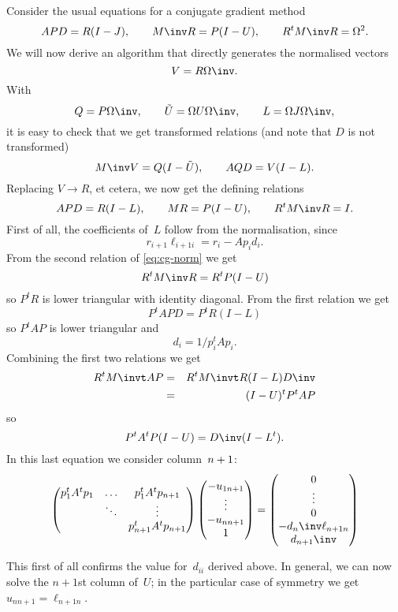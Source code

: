 \documentclass[11pt]{artikel3}
\begin{document}
\begin{Outline}
Consider the usual equations for a conjugate gradient method
\[ APD=R(I-J),\qquad M\inv R=P(I-U),\qquad R^tM\inv R=\Omega^2. \]
We will now derive an algorithm that directly generates
the normalised vectors
\[ V=R\Omega\inv.\]
With
\[ Q=P\Omega\inv,\qquad \tilde U=\Omega U\Omega\inv,
    \qquad L=\Omega J\Omega\inv,\]
it is easy to check that we get transformed relations
(and note that $D$ is not transformed)
\[ M\inv V=Q(I-\tilde U),\qquad AQD=V(I-L). \]
Replacing $V\rightarrow R$, et cetera, we now get the defining
relations
\begin{equation} APD=R(I-L),\qquad MR=P(I-U),\qquad R^tM\inv R=I.
    \label{eq:cg-norm}\end{equation}
First of all, the coefficients of~$L$ follow from the normalisation,
since \[ r_{i+1}\ell_{i+1i}=r_i-Ap_id_i. \]
From the second relation of \eqref{eq:cg-norm} we get
    \[ R^tM\inv R=R^tP(I-U) \]
so $P^tR$ is lower triangular with identity diagonal.
From the first relation we get \[ P^tAPD=P^tR(I-L) \]
so $P^tAP$ is lower triangular and \[ d_i=1/p_i^tAp_i.\]
Combining the first two relations we get
\begin{eqnarray*}
    R^tM\invt AP&=&R^tM\invt R(I-L)D\inv\cr &=&(I-U)^tP^tAP\end{eqnarray*}
so \[ P^tA^tP(I-U)=D\inv(I-L^t). \]
In this last equation we consider column~$n+\nobreak1$:
\begin{equation}
        \begin{pmatrix}p_1^tA^tp_1&\ldots&p_1^tA^tp_{n+1}\cr
                &\ddots&\vdots\cr
                &&p_{n+1}^tA^tp_{n+1}\end{pmatrix}
        \begin{pmatrix}-u_{1n+1}\cr \vdots \cr -u_{nn+1}\cr 1\end{pmatrix}
        =\begin{pmatrix}0\cr \vdots \cr 0 \cr -d_n\inv\ell_{n+1n}\cr d_{n+1}\inv\end{pmatrix}
\end{equation}
\iffalse
Deleting the last row and column:
\begin{equation}
        {1\over p_n^tAp_n}
        \begin{pmatrix}p_1^tA^tp_1&\ldots&p_1^tA^tp_n\cr
                &\ddots&\vdots\cr
                &&p_n^tA^tp_n\end{pmatrix}
        \begin{pmatrix}u_{1n+1}\cr \vdots \cr u_{nn+1}\end{pmatrix}
        =\begin{pmatrix}0\cr \vdots \cr 0 \cr d_n\inv\ell_{n+1n}\end{pmatrix}
\end{equation}
\fi
This first of all confirms the value for~$d_{ii}$ derived above.
In general, we can now solve the $n+1$st column of~$U$;
in the particular case of symmetry we get $u_{nn+1}=\ell_{n+1n}$.


\end{Outline}
\end{document}
